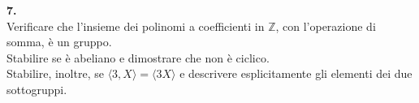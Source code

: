 \documentclass[italian,a4paper,11pt]
{article}
\newcommand{\Z}{\mathbb Z}
\newcommand{\acc}{\`}
\begin{document}
\vspace{0.4cm}
\noindent
\begin{Ex}\textbf{ 7.}\\
Verificare che l'insieme dei polinomi a coefficienti in $\Z$, con l'operazione di
somma, \acc e un gruppo. \\
Stabilire se \acc e abeliano e dimostrare che non \acc e ciclico. \\
Stabilire, inoltre, se $\langle3,X \rangle = \langle 3X \rangle$ e descrivere esplicitamente gli elementi dei
due sottogruppi.
\end{Ex}
\end{document}
